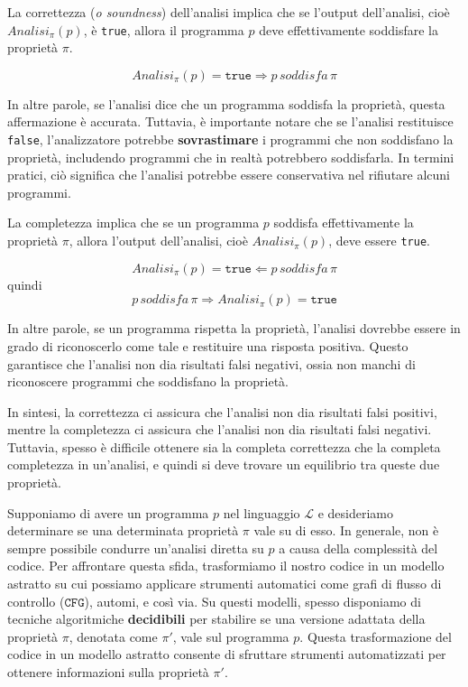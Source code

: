 \begin{tcolorbox}[title =Soundness (\textit{Correttezza})]
La correttezza (\textit{o soundness}) dell'analisi implica che se l'output dell'analisi,
cioè $Analisi_{\pi}(p)$, è \texttt{true}, allora il programma $p$ deve effettivamente soddisfare la
proprietà $\pi$.

\[ Analisi_{\pi}(p) = \texttt{true} \Longrightarrow p \,\textit{soddisfa} \,\pi \]
\end{tcolorbox}
In altre parole, se l'analisi dice che un programma soddisfa la proprietà,
questa affermazione è accurata. Tuttavia, è importante notare che se l'analisi restituisce \texttt{false},
l'analizzatore potrebbe \textbf{sovrastimare} i programmi che non soddisfano la proprietà, includendo programmi
che in realtà potrebbero soddisfarla. In termini pratici, ciò significa che l'analisi potrebbe essere
conservativa nel rifiutare alcuni programmi.

\begin{tcolorbox}[title={Completeness} (\textit{Completezza})]
La completezza implica che se un programma $p$ soddisfa effettivamente la proprietà $\pi$,
allora l'output dell'analisi, cioè $Analisi_{\pi}(p)$, deve essere \texttt{true}.

\[ Analisi_{\pi}(p) = \texttt{true} \Longleftarrow p \,\textit{soddisfa} \,\pi \]
quindi
\[ p \,\textit{soddisfa} \,\pi \Longrightarrow Analisi_{\pi}(p) = \texttt{true} \]
\end{tcolorbox}
In altre parole, se un programma rispetta la proprietà, l'analisi dovrebbe essere in grado di riconoscerlo come
tale e restituire una risposta positiva. Questo garantisce che l'analisi non dia risultati
falsi negativi, ossia non manchi di riconoscere programmi che soddisfano la proprietà.

In sintesi, la correttezza ci assicura che l'analisi non dia risultati falsi positivi,
mentre la completezza ci assicura che l'analisi non dia risultati falsi negativi. Tuttavia,
spesso è difficile ottenere sia la completa correttezza che la completa completezza in un'analisi,
e quindi si deve trovare un equilibrio tra queste due proprietà.

Supponiamo di avere un programma $p$ nel linguaggio $\mathcal{L}$ e desideriamo
determinare se una determinata proprietà $\pi$ vale su di esso. In generale, non
è sempre possibile condurre un'analisi diretta su $p$ a causa della complessità del
codice. Per affrontare questa sfida, trasformiamo il nostro codice in un modello astratto
su cui possiamo applicare strumenti automatici come grafi di flusso di controllo ($\texttt{CFG}$),
automi, e così via. Su questi modelli, spesso disponiamo di tecniche algoritmiche \textbf{decidibili} per
stabilire se una versione adattata della proprietà $\pi$, denotata come $\pi'$, vale sul programma $p$.
Questa trasformazione del codice in un modello astratto consente di sfruttare
strumenti automatizzati per ottenere informazioni sulla proprietà $\pi'$.


